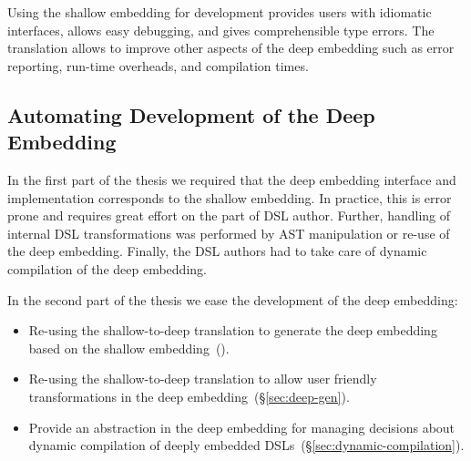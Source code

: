Using the shallow embedding for development provides users with idiomatic interfaces,
 allows easy debugging, and gives comprehensible type errors. The translation allows to improve other aspects of
 the deep embedding such as error reporting, run-time overheads, and compilation times.




\subsection{Automating Development of the Deep Embedding}
\label{sec:automating-developemnt}

 In the first part of the thesis we required that the deep embedding interface
 and implementation corresponds to the shallow embedding. In practice,
 this is error prone and requires great effort on the part of DSL author. Further,
 handling of internal DSL transformations was performed by AST manipulation or
 re-use of the deep embedding. Finally, the DSL authors had to take care of dynamic
 compilation of the deep embedding.

 In the second part of the thesis we ease the development of the deep embedding: \begin{itemize}

   \item Re-using the shallow-to-deep translation to generate the deep embedding based on the
    shallow embedding~().

   \item Re-using the shallow-to-deep translation to allow user friendly
    transformations in the deep embedding~(\S \ref{sec:deep-gen}).

    \item Provide an abstraction in the deep embedding for managing decisions about
     dynamic compilation of deeply embedded DSLs~(\S \ref{sec:dynamic-compilation}).

 \end{itemize}




